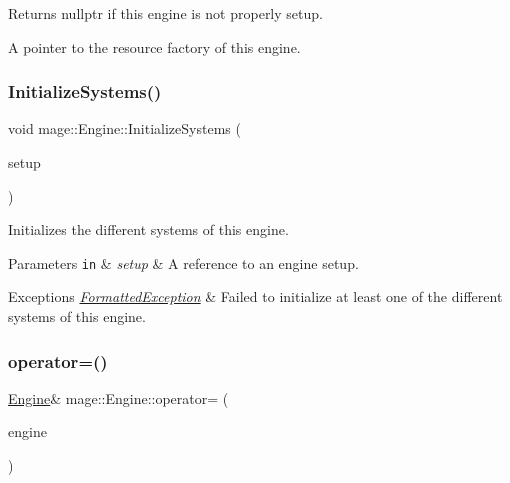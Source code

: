 \begin{DoxyReturn}{Returns}
{\ttfamily nullptr} if this engine is not properly setup. 

A pointer to the resource factory of this engine. 
\end{DoxyReturn}
\hypertarget{classmage_1_1_engine_a29a47448fb182b110d46d287a72b8b4e}{}\label{classmage_1_1_engine_a29a47448fb182b110d46d287a72b8b4e} 
\subsubsection{\texorpdfstring{Initialize\+Systems()}{InitializeSystems()}}
{\footnotesize\ttfamily void mage\+::\+Engine\+::\+Initialize\+Systems (\begin{DoxyParamCaption}\item[{const \hyperlink{structmage_1_1_engine_setup}{Engine\+Setup} \&}]{setup }\end{DoxyParamCaption})\hspace{0.3cm}{\ttfamily [private]}}

Initializes the different systems of this engine.


\begin{DoxyParams}[1]{Parameters}
\mbox{\tt in}  & {\em setup} & A reference to an engine setup. \\
\hline
\end{DoxyParams}

\begin{DoxyExceptions}{Exceptions}
{\em \hyperlink{structmage_1_1_formatted_exception}{Formatted\+Exception}} & Failed to initialize at least one of the different systems of this engine. \\
\hline
\end{DoxyExceptions}
\hypertarget{classmage_1_1_engine_a1eedff82d4c8207c61676230520648fd}{}\label{classmage_1_1_engine_a1eedff82d4c8207c61676230520648fd} 
\subsubsection{\texorpdfstring{operator=()}{operator=()}\hspace{0.1cm}{\footnotesize\ttfamily [1/2]}}
{\footnotesize\ttfamily \hyperlink{classmage_1_1_engine}{Engine}\& mage\+::\+Engine\+::operator= (\begin{DoxyParamCaption}\item[{const \hyperlink{classmage_1_1_engine}{Engine} \&}]{engine }\end{DoxyParamCaption})\hspace{0.3cm}{\ttfamily [delete]}}

